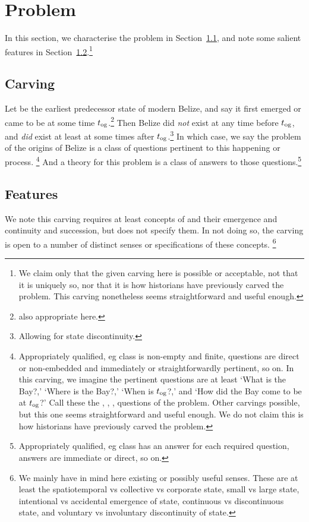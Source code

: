 \section{Problem}
\label{s:problem}
	In this section, we characterise the problem in Section~\ref{ss:carving}, and note some salient features in Section~\ref{ss:features}.\footnote{We claim only that the given carving here is possible or acceptable, not that it is uniquely so, nor that it is how historians have previously carved the problem. This carving nonetheless seems straightforward and useful enough.}
	\subsection{Carving}
	\label{ss:carving}
		Let  be the earliest predecessor state of modern Belize, and say it first emerged or came to be at some time \(t_{\operatorname{og}}\).\footnote{ also appropriate here.} Then Belize did \emph{not} exist at any time before \(t_{\operatorname{og}}\), and \emph{did} exist at least at some times after \(t_{\operatorname{og}}\).\footnote{Allowing for state discontinuity.} In which case, we say the problem of the origins of Belize is a class of questions pertinent to this happening or process.%
		\footnote{Appropriately qualified, eg class is non-empty and finite, questions are direct or non-embedded and immediately or straightforwardly pertinent, so on. In this carving, we imagine the pertinent questions are at least `What is the Bay?,' `Where is the Bay?,' `When is \(t_{\operatorname{og}}\)?,' and `How did the Bay come to be at \(t_{\operatorname{og}}\)?' Call these the , , ,  questions of the problem. Other carvings possible, but this one seems straightforward and useful enough. We do not claim this is how historians have previously carved the problem.}
		And a theory for this problem is a class of answers to those questions.\footnote{Appropriately qualified, eg class has an answer for each required question, answers are immediate or direct, so on.}
	\subsection{Features}
	\label{ss:features}
		We note this carving requires at least concepts of  and their emergence and continuity and succession, but does not specify them. In not doing so, the carving is open to a number of distinct senses or specifications of these concepts.%
		\footnote{We mainly have in mind here existing or possibly useful senses. These are at least the spatiotemporal vs collective vs corporate state, small vs large state, intentional vs accidental emergence of state, continuous vs discontinuous state, and voluntary vs involuntary discontinuity of state.}
	
